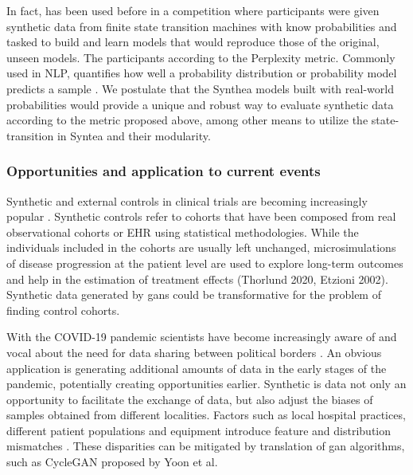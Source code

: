 In fact, has been used before in a competition where participants were given synthetic data from finite state transition machines with know probabilities and tasked to build and learn models that would reproduce those of the original, unseen models. The participants according to the Perplexity metric. Commonly used in NLP, quantifies how well a probability distribution or probability model predicts a sample \cite{Verwer_2013}. We postulate that the Synthea models built with real-world probabilities would provide a unique and robust way to evaluate synthetic data according to the metric proposed above, among other means to utilize the state-transition in Syntea and their modularity.

\subsubsection{Opportunities and application to current events}
Synthetic and external controls in clinical trials are becoming increasingly popular \cite{Thorlund2020}. Synthetic controls refer to cohorts that have been composed from real observational cohorts or EHR using statistical methodologies. While the individuals included in the cohorts are usually left unchanged, microsimulations of disease progression at the patient level are used to explore long-term outcomes and help in the estimation of treatment effects (Thorlund 2020, Etzioni 2002). Synthetic data generated by \glspl{gan} could be transformative for the problem of finding control cohorts.\par
With the COVID-19 pandemic scientists have become increasingly aware of and vocal about the need for data sharing between political borders \cite{Cosgriff_2020,Becker_2020,McLennan_2020}. An obvious application is generating additional amounts of data in the early stages of the pandemic, potentially creating opportunities earlier. Synthetic is data not only an opportunity to facilitate the exchange of data, but also adjust the biases of samples obtained from different localities. Factors such as local hospital practices, different patient populations and equipment introduce feature and distribution mismatches \cite{Ghassemi2020}. These disparities can be mitigated by translation of \gls{gan} algorithms, such as CycleGAN proposed by Yoon et al.

